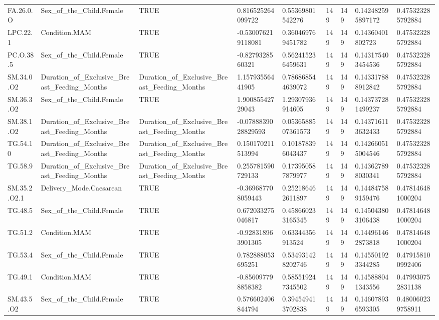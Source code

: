 \begin{longtable}{lllllllll}
FA.26.0.O & Sex\_of\_the\_Child.Female & TRUE & 0.816525264099722 & 0.55369801542276 & 149 & 149 & 0.142482595897172 & 0.475323285792884 \\
LPC.22.1 & Condition.MAM & TRUE & -0.530076219118081 & 0.360469769451782 & 149 & 149 & 0.14360401802723 & 0.475323285792884 \\
PC.O.38.5 & Sex\_of\_the\_Child.Female & TRUE & -0.8279328560321 & 0.562415236459631 & 149 & 149 & 0.143175403454536 & 0.475323285792884 \\
SM.34.0.O2 & Duration\_of\_Exclusive\_Breast\_Feeding\_Months & Duration\_of\_Exclusive\_Breast\_Feeding\_Months & 1.15793556441905 & 0.786868544639072 & 149 & 149 & 0.143317888912842 & 0.475323285792884 \\
SM.36.3.O2 & Sex\_of\_the\_Child.Female & TRUE & 1.90085542729043 & 1.29307936914605 & 149 & 149 & 0.143737281499237 & 0.475323285792884 \\
SM.38.1.O2 & Duration\_of\_Exclusive\_Breast\_Feeding\_Months & Duration\_of\_Exclusive\_Breast\_Feeding\_Months & -0.0788839028829593 & 0.0536588507361573 & 149 & 149 & 0.143716113632433 & 0.475323285792884 \\
TG.54.10 & Duration\_of\_Exclusive\_Breast\_Feeding\_Months & Duration\_of\_Exclusive\_Breast\_Feeding\_Months & 0.150170211513994 & 0.101878396043437 & 149 & 149 & 0.142660515004546 & 0.475323285792884 \\
TG.58.9 & Duration\_of\_Exclusive\_Breast\_Feeding\_Months & Duration\_of\_Exclusive\_Breast\_Feeding\_Months & 0.255781590729133 & 0.173950587879977 & 149 & 149 & 0.143627898030341 & 0.475323285792884 \\
SM.35.2.O2.1 & Delivery\_Mode.Caesarean & TRUE & -0.369687708059443 & 0.252186462611897 & 149 & 149 & 0.144847589159476 & 0.478146481000204 \\
TG.48.5 & Sex\_of\_the\_Child.Female & TRUE & 0.672033275046817 & 0.458660233165345 & 149 & 149 & 0.145043803106438 & 0.478146481000204 \\
TG.51.2 & Condition.MAM & TRUE & -0.928318963901305 & 0.63344356913524 & 149 & 149 & 0.144961462873818 & 0.478146481000204 \\
TG.53.4 & Sex\_of\_the\_Child.Female & TRUE & 0.782888053695251 & 0.534931428202746 & 149 & 149 & 0.145501923344285 & 0.479158100992406 \\
TG.49.1 & Condition.MAM & TRUE & -0.856097798858382 & 0.585519247345502 & 149 & 149 & 0.145888041343556 & 0.479930752831138 \\
SM.43.5.O2 & Sex\_of\_the\_Child.Female & TRUE & 0.576602406844794 & 0.394549413702838 & 149 & 149 & 0.146078936593305 & 0.480060239758911 \\

\end{longtable}
